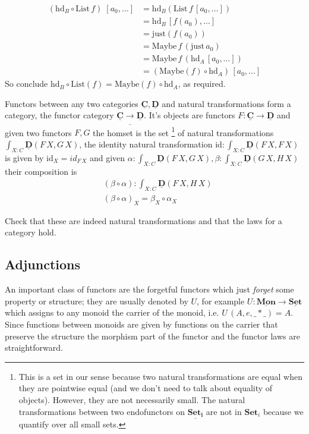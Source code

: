 \documentclass{article}
\newcommand{\Set}{\mathbf{Set}}
\newcommand{\cat}[1]{\underline{\mathbf{#1}}}
\newcommand{\homC}[3]{\cat{#1}(#2,#3)}
\newcommand{\id}{\mathrm{id}}
\newcommand{\List}{\mathrm{List}}
\newcommand{\Maybe}{\mathrm{Maybe}}
\newcommand{\just}{\mathrm{just}}
\newcommand{\hd}{\mathrm{hd}}
\begin{document}
\begin{Answer}
\begin{align*}
        (\hd_B\circ\List\,f)\;[a_0,\ldots]
            &= \hd_B(\List\,f\,[a_0,\ldots])\\
            &= \hd_B\,[f(a_0),\ldots]\\
            &= \just(f(a_0))\\
            &= \Maybe\,f\,(\just\,a_0)\\
            &= \Maybe\,f\,(\hd_A\,[a_0,\ldots])\\
            &= (\Maybe(f)\circ\hd_A)\,[a_0,\ldots]
     \end{align*}
     So conclude $\hd_B\circ\List(f) = \Maybe(f)\circ\hd_A$, as required.
\end{Answer}

Functors between any two categories $\cat{C},\cat{D}$ and natural transformations form a category, the functor category $\cat{C}\cat{\to}\cat{D}$. It's objects are functors $F : \cat{C} \to \cat{D}$ and given two functors $F,G$ the homset is the set
\footnote{This is a set in our sense because two natural transformations are equal when they are pointwise equal (and we don't need to talk about equality of objects). However, they are not necessarily small. The natural transformations between two endofunctors on $\cat{\Set_i}$ are not in $\Set_i$ because we quantify over all small sets.}
of natural transformations $\int_{X:C} \homC{D}{F\,X}{G\,X}$, the identity natural transformation $\id : \int_{X:C}\homC{D}{F\,X}{F\,X}$ is given by $\id_X = id_{F\,X}$ and given $\alpha : \int_{X:C} \homC{D}{F\,X}{G\,X}, \beta : \int_{X:C}\homC{D}{G\,X}{H\,X}$ their composition is 
\begin{align*}
& (\beta \circ \alpha) : \int_{X:C} \homC{D}{F\,X}{H\,X}\\
& (\beta \circ \alpha)_X = \beta_X \circ \alpha_X
\end{align*}
\begin{Exercise}
  Check that these are indeed natural transformations and that the laws for a category hold.
\end{Exercise}

\subsection{Adjunctions}
\label{sec:adjunctions}

An important class of functors are the forgetful functors which just \emph{forget} some property or structure; they are usually denoted by $U$, for example $U : \cat{Mon} \to \cat{Set}$ which assigns to any monoid the carrier of the monoid, i.e. $U\,(A,e,\_*\_) = A$. Since functions between monoids are given by functions on the carrier that preserve the structure the morphism part of the functor and the functor laws are straightforward. 
\end{document}

